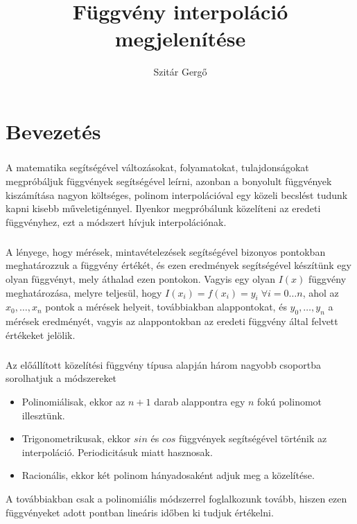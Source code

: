 \documentclass{elteikthesis}
\title{Függvény interpoláció megjelenítése}
\author{Szitár Gergő}
\begin{document}
\frontmatter

	\maketitle
	\tableofcontents
	
\mainmatter

\chapter{Bevezetés}
\paragraph{}
A matematika segítségével változásokat, folyamatokat, tulajdonságokat megpróbáljuk függvények segítségével leírni, azonban a bonyolult függvények kiszámítása nagyon költséges, polinom interpolációval egy közeli becslést tudunk kapni kisebb műveletigénnyel. Ilyenkor megpróbálunk közelíteni az eredeti függvényhez, ezt a módszert hívjuk interpolációnak.
\paragraph{}
A lényege, hogy mérések, mintavételezések segítségével bizonyos pontokban meghatározzuk a függvény értékét, és ezen eredmények segítségével készítünk egy olyan függvényt, mely áthalad ezen pontokon. Vagyis egy olyan $I(x)$ függvény meghatározása, melyre teljesül, hogy $I(x_i)=f(x_i)=y_i \; \forall i = 0 \dots n$, ahol az $x_0, \dots, x_n$ pontok a mérések helyeit, továbbiakban alappontokat, és $y_0, \dots, y_n$ a mérések eredményét, vagyis az alappontokban az eredeti függvény által felvett értékeket jelölik.
\paragraph{}
Az előállított közelítési függvény típusa alapján három nagyobb csoportba sorolhatjuk a módszereket
\begin{itemize}
\item Polinomiálisak, ekkor az $n+1$ darab alappontra egy $n$ fokú polinomot illesztünk.
\item Trigonometrikusak, ekkor $sin$ és $cos$ függvények segítségével történik az interpoláció. Periodicitásuk miatt hasznosak.
\item Racionális, ekkor két polinom hányadosaként adjuk meg a közelítése.
\end{itemize}
A továbbiakban csak a polinomiális módszerrel foglalkozunk tovább, hiszen ezen függvényeket adott pontban lineáris időben ki tudjuk értékelni.
\end{document}
